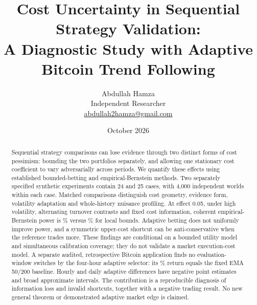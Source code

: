 \documentclass[11pt]{article}
\title{Cost Uncertainty in Sequential Strategy Validation:\\A Diagnostic Study with Adaptive Bitcoin Trend Following}
\author{Abdullah Hamza\\Independent Researcher\\
\small\href{mailto:abdullah2hamza@gmail.com}{abdullah2hamza@gmail.com}}
\date{October 2026}
\begin{document}
\maketitle
\begin{abstract}
Sequential strategy comparisons can lose evidence through two distinct forms
of cost pessimism: bounding the two portfolios separately, and allowing one
stationary cost coefficient to vary adversarially across periods. We quantify
these effects using established bounded-betting and empirical-Bernstein methods.
Two separately specified synthetic experiments contain 24 and 25 cases, with
4,000 independent worlds within each case. Matched comparisons distinguish cost
geometry, evidence form, volatility adaptation and whole-history nuisance
profiling. At effect 0.05, under high volatility, alternating turnover contrasts
and fixed cost information, coherent empirical-Bernstein power is
\FollowupStaticAltCoherent\% versus \FollowupStaticAltLocal\% for local bounds.
Adaptive betting does not uniformly improve power, and a symmetric upper-cost
shortcut can be anti-conservative when the reference trades more. These findings
are conditional on a bounded utility model and simultaneous calibration coverage;
they do not validate a market execution-cost model. A separate audited,
retrospective Bitcoin application finds no evaluation-window switches by the
four-hour adaptive selector: its \PrimaryFixedReturn\% return equals the fixed
EMA 50/200 baseline. Hourly and daily adaptive differences have negative point
estimates and broad approximate intervals. The contribution is a reproducible
diagnosis of information loss and invalid shortcuts, together with a negative
trading result. No new general theorem or demonstrated adaptive market edge is
claimed.
\end{abstract}







\clearpage
\appendix

\end{document}
